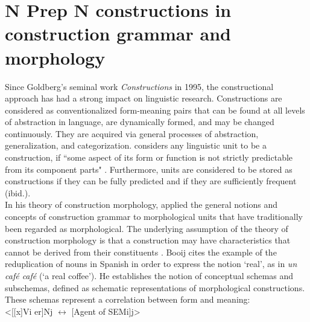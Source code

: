 \documentclass[output=paper]{langsci/langscibook}
\begin{document}
\section{N Prep N constructions in construction grammar and morphology}

Since Goldberg’s seminal work \textit{Constructions} in 1995, the constructional approach has had a strong impact on linguistic research. Constructions are considered as conventionalized form-meaning pairs that can be found at all levels of abstraction in language, are dynamically formed, and may be changed continuously. They are acquired via general processes of abstraction, generalization, and categorization. \citet{Goldberg:2006} considers any linguistic unit to be a construction, if ``some aspect of its form or function is not strictly predictable from its component parts" \citep[5]{Goldberg:2006}. Furthermore, units are considered to be stored as constructions if they can be fully predicted and if they are sufficiently frequent (ibid.).\\

In his theory of construction morphology, \citet{Booij:2015} applied the general notions and concepts of construction grammar to morphological units that have traditionally been regarded as morphological. The underlying assumption of the theory of construction morphology is that a construction may have characteristics that cannot be derived from their constituents \citep[3]{Booij:2015}. Booij cites the example of the reduplication of nouns in Spanish in order to express the notion `real', as in \textit{un café café} (`a real coffee'). He establishes the notion of conceptual schemas and subschemas, defined as schematic representations of morphological constructions. These schemas represent a correlation between form and meaning:
\\

<[[x]Vi er]Nj $\leftrightarrow$ [Agent of SEMi]j>		\citep[2]{Booij:2015}
\\
\end{document}
